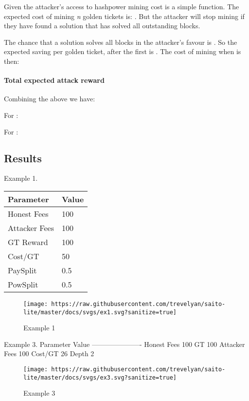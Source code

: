 \documentclass[
]{article}
\begin{document}
Given the attacker's access to hashpower mining cost is a simple
function. The expected cost of mining \emph{n} golden tickets is: . But
the attacker will stop mining if they have found a solution that has
solved all outstanding blocks.

The chance that a solution solves all blocks in the attacker's favour is
. So the expected saving per golden ticket, after the first is . The
cost of mining when is then:

\hypertarget{total-expected-attack-reward}{%
\paragraph{Total expected attack
reward}\label{total-expected-attack-reward}}

Combining the above we have:

For :

For :

\hypertarget{results}{%
\subsection{Results}\label{results}}

Example 1.

\begin{longtable}[]{@{}ll@{}}
\toprule
Parameter & Value\tabularnewline
\midrule
\endhead
Honest Fees & 100\tabularnewline
Attacker Fees & 100\tabularnewline
GT Reward & 100\tabularnewline
Cost/GT & 50\tabularnewline
PaySplit & 0.5\tabularnewline
PowSplit & 0.5\tabularnewline
\bottomrule
\end{longtable}

\begin{figure}
\centering
\texttt{[image: https://raw.githubusercontent.com/trevelyan/saito-lite/master/docs/svgs/ex1.svg?sanitize=true]}
\caption{Example 1}
\end{figure}

Example 3. \textbar{} Parameter \textbar{} Value \textbar{}
\textbar---------------\textbar-------\textbar{} \textbar{} Honest Fees
\textbar{} 100 \textbar{} \textbar{} GT \textbar{} 100 \textbar{}
\textbar{} Attacker Fees \textbar{} 100 \textbar{} \textbar{} Cost/GT
\textbar{} 26 \textbar{} \textbar{} Depth \textbar{} 2 \textbar{}

\begin{figure}
\centering
\texttt{[image: https://raw.githubusercontent.com/trevelyan/saito-lite/master/docs/svgs/ex3.svg?sanitize=true]}
\caption{Example 3}
\end{figure}
\end{document}
